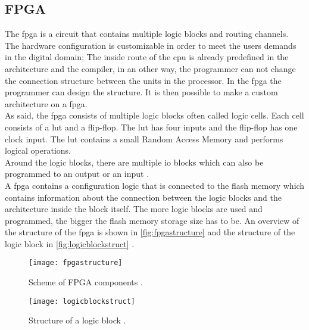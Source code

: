 \subsection{FPGA}


The \gls{fpga} is a circuit that contains multiple logic blocks and routing channels.\\
The hardware configuration is customizable in order to meet the users demands in the digital domain; The inside route of the \gls{cpu} is already predefined in the architecture and the compiler, in an other way, the programmer can not change the connection structure between the units in the processor. In the \gls{fpga} the programmer can design the structure. It is then possible to make a custom architecture on a \gls{fpga}.  \\
As said, the \gls{fpga} consists of multiple logic blocks often called logic cells. Each cell consists of a \gls{lut} and a flip-flop. The \gls{lut} has four inputs and the flip-flop has one clock input. The \gls{lut} contains a small Random Access Memory and performs logical operations. \\
Around the logic blocks, there are multiple \gls{io} blocks which can also be programmed to an output or an input \citep {FPGA_youtube} \citep{FPGA_center} \citep{FPGA_toronto}.  \\
A \gls{fpga} contains a configuration logic that is connected to the flash memory which contains information about the connection between the logic blocks and the architecture inside the block itself. The more logic blocks are used and programmed, the bigger the flash memory storage size has to be. An overview of the structure of the \gls{fpga} is shown in \autoref{fig:fpgastructure} and the structure of the logic block in \autoref{fig:logicblockstruct} \citep {FPGA_youtube} \citep{FPGA_center} \citep{FPGA_toronto}.  \\
\newline

\begin{figure}[htbp]
	\centering
	\texttt{[image: fpgastructure]}
	\caption{Scheme of FPGA components \citep{FPGA_toronto}.}
	\label{fig:fpgastructure}
\end{figure}

\begin{figure}[htbp]
	\centering
	\texttt{[image: logicblockstruct]}
	\caption{Structure of a logic block \citep{FPGA_toronto}.}
	\label{fig:logicblockstruct}
\end{figure}


